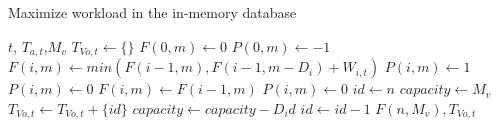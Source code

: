 \begin{algorithm}[!htb]
\caption{Maximize workload in the in-memory database}
\label{alg:2}
    \begin{algorithmic}[1]
    \Require $t$, $T_{a, t}$,$M_v$
    \State $T_{Vo, t} \gets \{\}$
    \State $F(0,m) \gets 0$
    \State $P(0,m) \gets -1$
    \EndFor
           \State $F(i,m)\gets min(F(i-1,m),F(i-1,m-D_i)+W_{i,t})$
                  \State $P(i,m)\gets 1$
                  \Else
                  \State $P(i,m)\gets 0$
                  \EndIf
          \Else
          \State $F(i,m)\gets F(i-1,m)$
          \State $P(i,m)\gets 0$
          \EndIf
        \EndFor
      \EndFor
     \State $id\gets n$
     \State $capacity\gets M_v$
     \State $T_{Vo,t}\gets T_{Vo,t}+\{id\}$
     \State $capacity\gets capacity-D_id$
     \EndIf
     \State $id\gets id-1$
     \EndWhile
     \Ensure $F(n,M_v),T_{Vo,t}$
    \end{algorithmic}
\end{algorithm}
